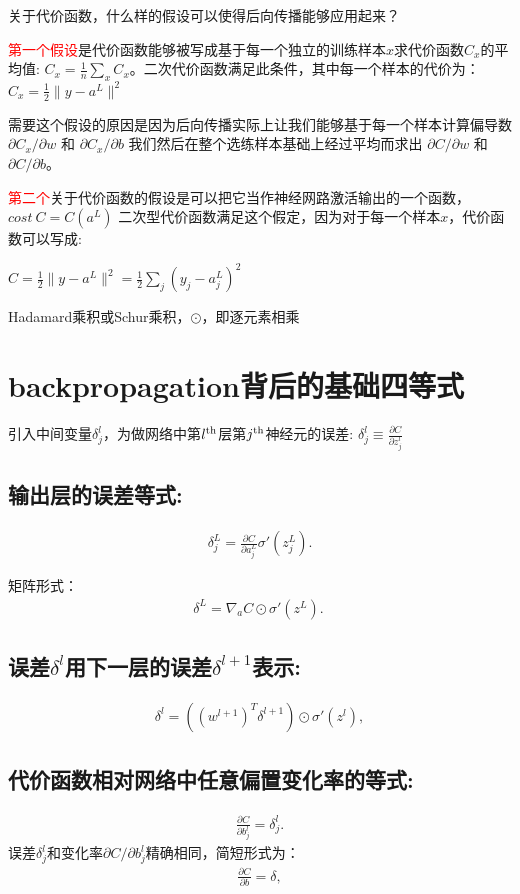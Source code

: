 关于代价函数，什么样的假设可以使得后向传播能够应用起来？\par
\textcolor{red}{第一个假设}是代价函数能够被写成基于每一个独立的训练样本$x$求代价函数$C_x$的平均值:
$C_x=\frac{1}{n}\sum_x C_x$。二次代价函数满足此条件，其中每一个样本的代价为：
$C_x = \frac{1}{2} \|y­-a^L\|^2$ \par
需要这个假设的原因是因为后向传播实际上让我们能够基于每一个样本计算偏导数
$\partial C_x / \partial w$ 和 $\partial C_x / \partial b$
我们然后在整个选练样本基础上经过平均而求出
$\partial C / \partial w$ 和 $\partial C / \partial b$。

\textcolor{red}{第二个}关于代价函数的假设是可以把它当作神经网路激活输出的一个函数，
$cost \ C = C(a^L)$
二次型代价函数满足这个假定，因为对于每一个样本$x$，代价函数可以写成:\par
\centerline{$C = \frac{1}{2} \|y-­a^L\|^2 = \frac{1}{2} \sum_j (y_j-a^L_j)^2$}

Hadamard乘积或Schur乘积，$\odot$，即逐元素相乘

\section{backpropagation背后的基础四等式}
引入中间变量$\delta^l_j$，为做网络中第$l^{\rm th}$层第$j^{\rm th}$神经元的误差:
$\delta^l_j \equiv \frac{\partial C}{\partial z^l_j}$

\subsection{输出层的误差等式:}
\begin{align} 
\delta^L_j = \frac{\partial C}{\partial a^L_j} \sigma'(z^L_j). \tag{BP1}
\end{align}\par
矩阵形式：
\begin{align}
\delta^L = \nabla_a C \odot \sigma'(z^L). \tag{BP1a}\
\end{align}

\subsection{误差$\delta^l$用下一层的误差$\delta^{l+1}$表示:}
\begin{align}
\delta^l = ((w^{l+1})^T \delta^{l+1}) \odot \sigma'(z^l), \tag{BP2}
\end{align}

\subsection{代价函数相对网络中任意偏置变化率的等式:}
\begin{align}
\frac{\partial C}{\partial b^l_j} = \delta^l_j. \tag{BP3}
\end{align}
误差$\delta^l_j$和变化率$\partial C / \partial b^l_j$精确相同，简短形式为：
\begin{align}
\frac{\partial C}{\partial b} = \delta,\tag{31}
\end{align}

